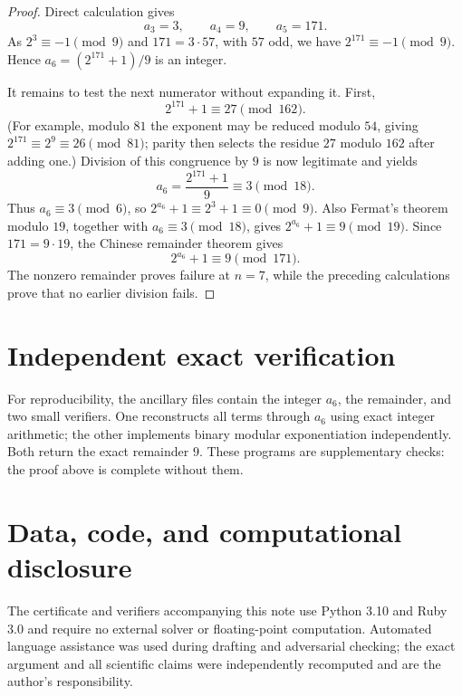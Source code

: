 \documentclass[11pt]{amsart}
\theoremstyle{definition}
\begin{document}
\begin{proof}
Direct calculation gives
\[
 a_3=3,\qquad a_4=9,\qquad a_5=171.
\]
As $2^3\equiv-1\pmod9$ and $171=3\cdot57$, with $57$ odd, we have
$2^{171}\equiv-1\pmod9$.  Hence $a_6=(2^{171}+1)/9$ is an integer.

It remains to test the next numerator without expanding it.  First,
\[
 2^{171}+1\equiv27\pmod{162}.
\]
(For example, modulo $81$ the exponent may be reduced modulo $54$, giving
$2^{171}\equiv2^9\equiv26\pmod{81}$; parity then selects the residue $27$
modulo $162$ after adding one.)  Division of this congruence by $9$ is now
legitimate and yields
\[
 a_6=\frac{2^{171}+1}{9}\equiv3\pmod{18}.
\]
Thus $a_6\equiv3\pmod6$, so $2^{a_6}+1\equiv2^3+1\equiv0\pmod9$.
Also Fermat's theorem modulo $19$, together with $a_6\equiv3\pmod{18}$,
gives $2^{a_6}+1\equiv9\pmod{19}$.  Since $171=9\cdot19$, the Chinese
remainder theorem gives
\[
 2^{a_6}+1\equiv9\pmod{171}.
\]
The nonzero remainder proves failure at $n=7$, while the preceding
calculations prove that no earlier division fails.
\end{proof}

\section{Independent exact verification}

For reproducibility, the ancillary files contain the integer $a_6$, the
remainder, and two small verifiers.  One reconstructs all terms through
$a_6$ using exact integer arithmetic; the other implements binary modular
exponentiation independently.  Both return the exact remainder $9$.  These
programs are supplementary checks: the proof above is complete without them.

\section*{Data, code, and computational disclosure}
The certificate and verifiers accompanying this note use Python 3.10 and
Ruby 3.0 and require no external solver or floating-point computation.
Automated language assistance was used during drafting and adversarial
checking; the exact argument and all scientific claims were independently
recomputed and are the author's responsibility.



\end{document}
